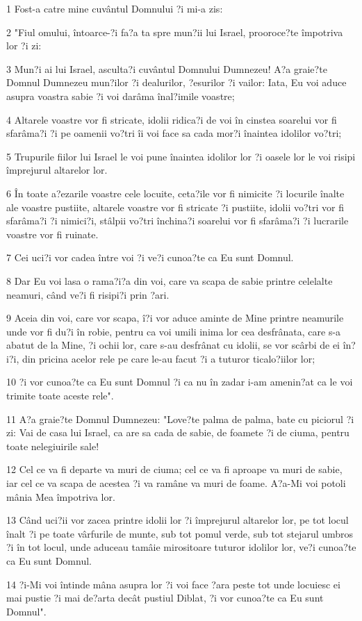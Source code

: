 \par 1 Fost-a catre mine cuvântul Domnului ?i mi-a zis:
\par 2 "Fiul omului, întoarce-?i fa?a ta spre mun?ii lui Israel, prooroce?te împotriva lor ?i zi:
\par 3 Mun?i ai lui Israel, asculta?i cuvântul Domnului Dumnezeu! A?a graie?te Domnul Dumnezeu mun?ilor ?i dealurilor, ?esurilor ?i vailor: Iata, Eu voi aduce asupra voastra sabie ?i voi darâma înal?imile voastre;
\par 4 Altarele voastre vor fi stricate, idolii ridica?i de voi în cinstea soarelui vor fi sfarâma?i ?i pe oamenii vo?tri îi voi face sa cada mor?i înaintea idolilor vo?tri;
\par 5 Trupurile fiilor lui Israel le voi pune înaintea idolilor lor ?i oasele lor le voi risipi împrejurul altarelor lor.
\par 6 În toate a?ezarile voastre cele locuite, ceta?ile vor fi nimicite ?i locurile înalte ale voastre pustiite, altarele voastre vor fi stricate ?i pustiite, idolii vo?tri vor fi sfarâma?i ?i nimici?i, stâlpii vo?tri închina?i soarelui vor fi sfarâma?i ?i lucrarile voastre vor fi ruinate.
\par 7 Cei uci?i vor cadea între voi ?i ve?i cunoa?te ca Eu sunt Domnul.
\par 8 Dar Eu voi lasa o rama?i?a din voi, care va scapa de sabie printre celelalte neamuri, când ve?i fi risipi?i prin ?ari.
\par 9 Aceia din voi, care vor scapa, î?i vor aduce aminte de Mine printre neamurile unde vor fi du?i în robie, pentru ca voi umili inima lor cea desfrânata, care s-a abatut de la Mine, ?i ochii lor, care s-au desfrânat cu idolii, se vor scârbi de ei în?i?i, din pricina acelor rele pe care le-au facut ?i a tuturor ticalo?iilor lor;
\par 10 ?i vor cunoa?te ca Eu sunt Domnul ?i ca nu în zadar i-am amenin?at ca le voi trimite toate aceste rele".
\par 11 A?a graie?te Domnul Dumnezeu: "Love?te palma de palma, bate cu piciorul ?i zi: Vai de casa lui Israel, ca are sa cada de sabie, de foamete ?i de ciuma, pentru toate nelegiuirile sale!
\par 12 Cel ce va fi departe va muri de ciuma; cel ce va fi aproape va muri de sabie, iar cel ce va scapa de acestea ?i va ramâne va muri de foame. A?a-Mi voi potoli mânia Mea împotriva lor.
\par 13 Când uci?ii vor zacea printre idolii lor ?i împrejurul altarelor lor, pe tot locul înalt ?i pe toate vârfurile de munte, sub tot pomul verde, sub tot stejarul umbros ?i în tot locul, unde aduceau tamâie mirositoare tuturor idolilor lor, ve?i cunoa?te ca Eu sunt Domnul.
\par 14 ?i-Mi voi întinde mâna asupra lor ?i voi face ?ara peste tot unde locuiesc ei mai pustie ?i mai de?arta decât pustiul Diblat, ?i vor cunoa?te ca Eu sunt Domnul".

